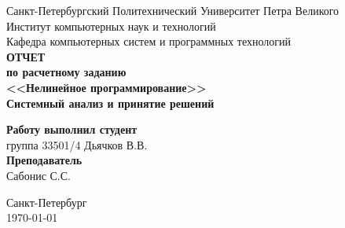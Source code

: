 \begin{titlepage}
\begin{center}
	Санкт-Петербургский Политехнический Университет Петра Великого\\[0.3cm]
	Институт компьютерных наук и технологий \\[0.3cm]
	Кафедра компьютерных систем и программных технологий\\[4cm]
	
	\textbf{ОТЧЕТ}\\ 
	\textbf{по расчетному заданию}\\[0.5cm]
	\textbf{<<Нелинейное программирование>>}\\[0.1cm]
	\textbf{Системный анализ и принятие решений}\\[4.0cm]
\end{center}

\begin{flushright}
	\begin{minipage}{0.45\textwidth}
		\textbf{Работу выполнил студент}\\[3mm]
		группа 33501/4 \hspace*{6mm} Дьячков В.В.\\[5mm]
		\textbf{Преподаватель}\\[5mm]
		\sign[3.5cm] \hspace*{5mm} Сабонис С.С. \\[5mm]
	\end{minipage}
\end{flushright}

\vfill

\begin{center}
	Санкт-Петербург\\
	\today
\end{center}
\end{titlepage}

\addtocounter{page}{1}